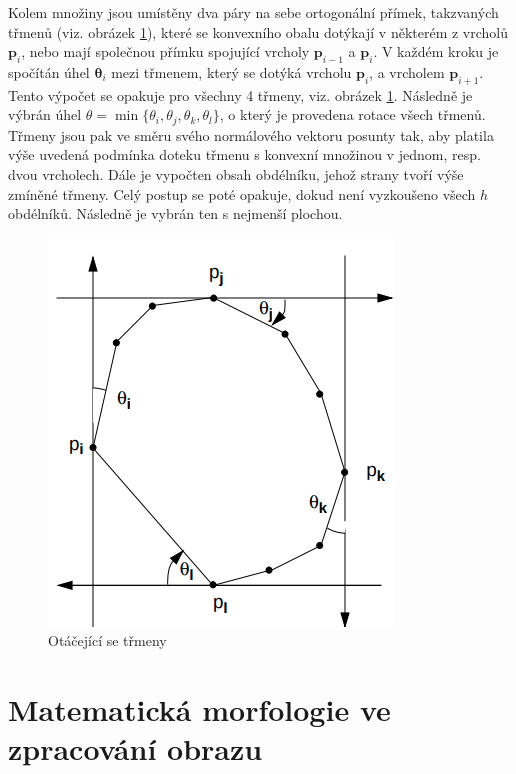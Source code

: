 \documentclass[twoside]{ctuthesis}
\newcommand{\tli}[2]{$\mathbf{#1}_{#2}$}
\begin{document}
Kolem množiny jsou umístěny dva páry na sebe ortogonální přímek, takzvaných třmenů (viz. obrázek \ref{fig:rotating_calipers}), které se konvexního obalu dotýkají v některém z vrcholů $\mathbf{p}_i$, nebo mají společnou přímku spojující vrcholy \tli{p}{i-1} a \tli{p}{i}. V každém kroku je spočítán úhel \tli{\theta}{i} mezi třmenem, který se dotýká vrcholu \tli{p}{i}, a vrcholem \tli{p}{i+1}. Tento výpočet se opakuje pro všechny 4 třmeny, viz. obrázek \ref{fig:rotating_calipers}. Následně je výbrán úhel $\theta = \min \{ \theta_i, \theta_j, \theta_k, \theta_l \}$, o který je provedena rotace všech třmenů. Třmeny jsou pak ve směru svého normálového vektoru posunty tak, aby platila výše uvedená podmínka doteku třmenu s konvexní množinou v jednom, resp. dvou vrcholech. Dále je vypočten obsah obdélníku, jehož strany tvoří výše zmíněné třmeny. Celý postup se poté opakuje, dokud není vyzkoušeno všech $h$ obdélníků. Následně je vybrán ten s nejmenší plochou. \cite{toussaint1984complexity}

\begin{figure}
    \centering
    \includegraphics[width = 0.7 \linewidth]{pictures/rotating_calipers.png}
    \caption{Otáčející se třmeny \cite{toussaint1984complexity}}
    \label{fig:rotating_calipers}
\end{figure}

\section{Matematická morfologie ve zpracování obrazu}
\label{sec:morphology}
\end{document}
